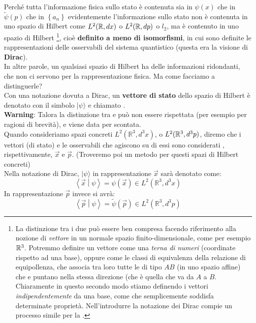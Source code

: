 \documentclass[FisicaTeorica.tex]{subfiles}
\begin{document}
Perché tutta l'informazione fisica sullo stato è contenuta sia in $\psi(x)$ che in $\tilde{\psi}(p)$ che in $\left\{a_n\right\}$ evidentemente l'informazione sullo stato non è contenuta in uno spazio di Hilbert  come $L^2(\mathbb{R},dx)$ o $L^2(\mathbb{R},dp)$ o $l_2$, ma è contenuto in uno spazio di Hilbert \footnote{La distinzione tra i due può essere ben compresa facendo riferimento alla nozione di \textit{vettore} in un normale spazio finito-dimensionale, come per esempio $\mathbb{R}^3$. Potremmo definire un vettore come una \textit{terna di numeri} (coordinate rispetto ad una base), oppure come le classi di equivalenza della relazione di equipollenza, che associa tra loro tutte le  di tipo $AB$ (in uno spazio affine) che  e puntano nella stessa direzione (che è quella che va da $A$ a $B$. Chiaramente in questo secondo modo stiamo definendo i vettori \textit{indipendentemente} da una base, come  che semplicemente soddisfa determinate proprietà. Nell'introdurre la notazione dei  Dirac compie un processo simile per la \MQ.}, cioè \textbf{definito a meno di isomorfismi}, in cui sono definite le rappresentazioni delle osservabili del sistema quantistico (questa era la visione di \textbf{Dirac}).\\
In altre parole, un qualsiasi spazio di Hilbert  ha delle informazioni ridondanti, che non ci servono per la rappresentazione fisica. Ma come facciamo a distinguerle?\\

Con una notazione dovuta a Dirac, un \textbf{vettore di stato} dello spazio di Hilbert  è denotato con il simbolo $|\psi\rangle$  e chiamato .\\ 
\textbf{Warning}: Talora la distinzione tra  e  può non essere rispettata (per esempio per ragioni di brevità), e viene data per scontata.\\
Quando consideriamo spazi concreti $L^2(\mathbb{R}^3,d^3x)$, o $L^2(\mathbb{R}^3,d^3p)$, diremo che i vettori (di stato) e le osservabili che agiscono su di essi sono considerati , rispettivamente, $\vec{x}$ e $\vec{p}$. (Troveremo poi un metodo per  questi spazi di Hilbert concreti)\\
Nella notazione di Dirac, $|\psi\rangle$ in rappresentazione $\vec{x}$ sarà denotato come:
\[
\left\langle\vec{x}\middle|\psi\right\rangle=\psi \left(\vec{x}\right)\in L^2(\mathbb{R}^3,d^3x)
\]
In rappresentazione $\vec{p}$ invece si avrà:
\[
\left\langle\vec{p}\middle|\psi\right\rangle=\tilde{\psi}\left(\vec{p}\right)\in L^2(\mathbb{R}^3,d^3p)
\]
\end{document}
